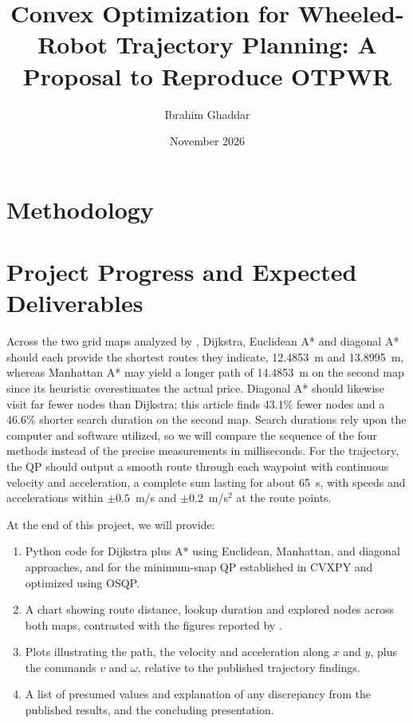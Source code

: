 \documentclass[12pt]{article}
\title{\vspace{-2.2cm}Convex Optimization for Wheeled-Robot Trajectory Planning: A Proposal to Reproduce OTPWR}
\author{Ibrahim Ghaddar}
\date{\vspace{-0.8cm}November 2026}
\begin{document}
\maketitle
\vspace{-1cm}

\section{Methodology}


\section{Project Progress and Expected Deliverables}
Across the two grid maps analyzed by \citet{luo2024otpwr}, Dijkstra, Euclidean A* and diagonal A* should each provide the shortest routes they indicate, 12.4853~m and 13.8995~m, whereas Manhattan A* may yield a longer path of 14.4853~m on the second map since its heuristic overestimates the actual price. Diagonal A* should likewise visit far fewer nodes than Dijkstra; this article finds 43.1\% fewer nodes and a 46.6\% shorter search duration on the second map. Search durations rely upon the computer and software utilized, so we will compare the sequence of the four methods instead of the precise measurements in milliseconds. For the trajectory, the QP should output a smooth route through each waypoint with continuous velocity and acceleration, a complete sum lasting for about 65~s, with speeds and accelerations within $\pm0.5$~m/s and $\pm0.2$~m/s$^2$ at the route points.

At the end of this project, we will provide:
\begin{enumerate}[leftmargin=*,itemsep=0pt]
\item Python code for Dijkstra plus A* using Euclidean, Manhattan, and diagonal approaches, and for the minimum-snap QP established in CVXPY and optimized using OSQP.
\item A chart showing route distance, lookup duration and explored nodes across both maps, contrasted with the figures reported by \citet{luo2024otpwr}.
\item Plots illustrating the path, the velocity and acceleration along $x$ and $y$, plus the commands $v$ and $\omega$, relative to the published trajectory findings.
\item A list of presumed values and explanation of any discrepancy from the published results, and the concluding presentation.
\end{enumerate}
\end{document}
